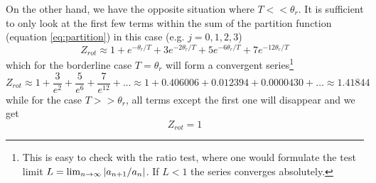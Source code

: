 \documentclass[10pt,a4paper]{amsart}
\begin{document}
On the other hand, we have the opposite situation where $T << \theta_r$. It is sufficient to only look at the first few terms within the sum of the partition function (equation \ref{eq:partition}) in this case (e.g. $j=0,1,2,3$)
\begin{equation}
Z_{rot} \approx 1+e^{-\theta_r/T}+3e^{-2\theta_r/T}+5e^{-6\theta_r/T}+7e^{-12\theta_r/T}
\end{equation}
which for the borderline case $T=\theta_r$ will form a convergent series\footnote{This is easy to check with the ratio test, where one would formulate the test limit $L=\lim_{n\to\infty}\abs{a_{n+1}/a_n}$. If $L<1$ the series converges absolutely.}
\begin{equation*}
Z_{rot} \approx 1 + \frac{3}{e^2}+\frac{5}{e^6}+\frac{7}{e^{12}} + \dots \approx 1 + 0.406006 + 0.012394 + 0.0000430 + \dots \approx 1.41844
\end{equation*}
while for the case $T >> \theta_r$, all terms except the first one will disappear and we get
\begin{equation*}
Z_{rot} = 1
\end{equation*}
\end{document}
